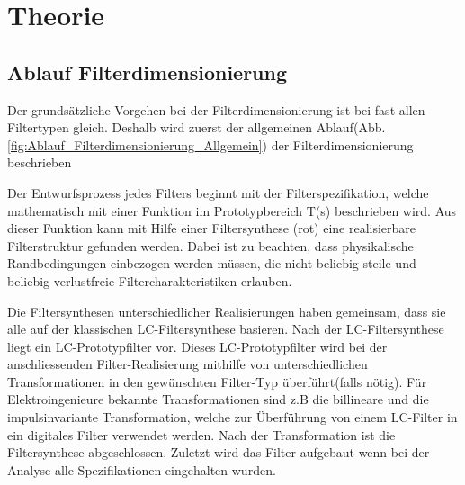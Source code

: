 \section{Theorie}











\subsection{Ablauf Filterdimensionierung}

Der grundsätzliche Vorgehen bei der Filterdimensionierung ist bei fast allen Filtertypen gleich. Deshalb wird zuerst der allgemeinen Ablauf(Abb.\ref{fig:Ablauf_Filterdimensionierung_Allgemein}) der Filterdimensionierung beschrieben 

Der Entwurfsprozess jedes Filters beginnt mit der Filterspezifikation, welche mathematisch mit einer Funktion im Prototypbereich T(s) beschrieben wird. Aus dieser Funktion kann mit Hilfe einer Filtersynthese (rot) eine realisierbare Filterstruktur gefunden werden. Dabei ist zu beachten, dass  physikalische Randbedingungen einbezogen werden müssen, die nicht beliebig steile und beliebig verlustfreie Filtercharakteristiken erlauben.

Die Filtersynthesen unterschiedlicher Realisierungen haben gemeinsam, dass sie alle auf der klassischen LC-Filtersynthese basieren. Nach der LC-Filtersynthese liegt ein LC-Prototypfilter vor. Dieses LC-Prototypfilter wird bei der anschliessenden Filter-Realisierung mithilfe von unterschiedlichen Transformationen in den gewünschten Filter-Typ überführt(falls nötig). Für Elektroingenieure bekannte Transformationen sind z.B die billineare und die impulsinvariante Transformation, welche zur Überführung von einem LC-Filter in ein digitales Filter verwendet werden. Nach der Transformation ist die Filtersynthese abgeschlossen. Zuletzt wird das Filter aufgebaut wenn bei der Analyse alle Spezifikationen eingehalten wurden.

